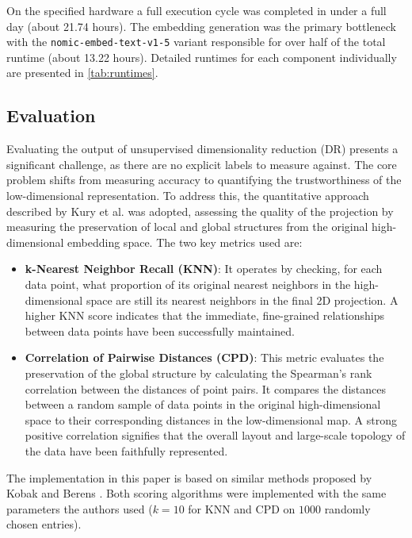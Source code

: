 On the specified hardware a full execution cycle was completed in under a full day (about 21.74 hours). The embedding generation was the primary bottleneck with the \texttt{nomic-embed-text-v1-5} variant responsible for over half of the total runtime (about 13.22 hours). Detailed runtimes for each component individually are presented in \autoref{tab:runtimes}.

\subsection{Evaluation}
\label{sec:eval}

Evaluating the output of unsupervised dimensionality reduction (DR) presents a significant challenge, as there are no explicit labels to measure against. The core problem shifts from measuring accuracy to quantifying the trustworthiness of the low-dimensional representation. To address this, the quantitative approach described by Kury et al. \cite{kuryDREAMSPreservingBoth2025} was adopted, assessing the quality of the projection by measuring the preservation of local and global structures from the original high-dimensional embedding space. The two key metrics used are:

\begin{itemize}
    \item \textbf{k-Nearest Neighbor Recall (KNN)}: It operates by checking, for each data point, what proportion of its original nearest neighbors in the high-dimensional space are still its nearest neighbors in the final 2D projection. A higher KNN score indicates that the immediate, fine-grained relationships between data points have been successfully maintained.
    \item \textbf{Correlation of Pairwise Distances (CPD)}: This metric evaluates the preservation of the global structure by calculating the Spearman's rank correlation between the distances of point pairs. It compares the distances between a random sample of data points in the original high-dimensional space to their corresponding distances in the low-dimensional map. A strong positive correlation signifies that the overall layout and large-scale topology of the data have been faithfully represented.
\end{itemize}

The implementation in this paper is based on similar methods proposed by Kobak and Berens \cite{kobakArtUsingTSNE2019}. Both scoring algorithms were implemented with the same parameters the authors used ($k=10$ for KNN and CPD on $1000$ randomly chosen entries).

